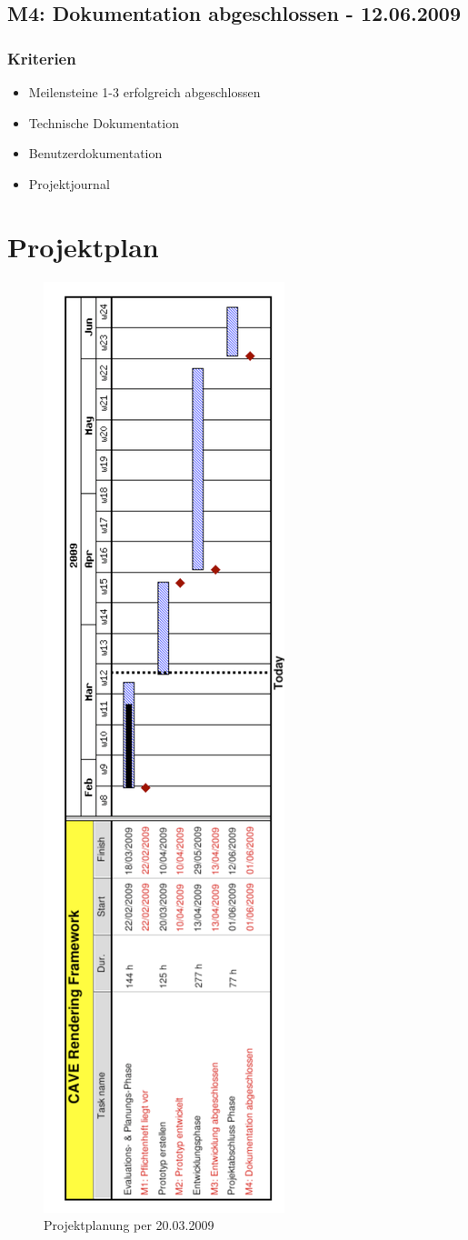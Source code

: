 \subsection{M4: Dokumentation abgeschlossen - 12.06.2009}
\subsubsection{Kriterien}
\begin{itemize}
	\item Meilensteine 1-3 erfolgreich abgeschlossen
	\item Technische Dokumentation
	\item Benutzerdokumentation
	\item Projektjournal
\end{itemize}

\clearpage
\section{Projektplan}
\begin{figure}[ht]
\centering
\includegraphics[scale=0.45]{../figures/gantt_20_3_09}
\caption{Projektplanung per 20.03.2009}
\end{figure}
